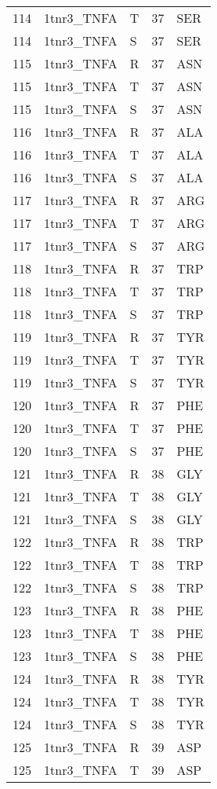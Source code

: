 \begin{tiny}
\begin{longtable}[l]{l|l|l|l|l}
	114 & 1tnr3\_TNFA & T & 37 & SER \\
	114 & 1tnr3\_TNFA & S & 37 & SER \\
	115 & 1tnr3\_TNFA & R & 37 & ASN \\
	115 & 1tnr3\_TNFA & T & 37 & ASN \\
	115 & 1tnr3\_TNFA & S & 37 & ASN \\
	116 & 1tnr3\_TNFA & R & 37 & ALA \\
	116 & 1tnr3\_TNFA & T & 37 & ALA \\
	116 & 1tnr3\_TNFA & S & 37 & ALA \\
	117 & 1tnr3\_TNFA & R & 37 & ARG \\
	117 & 1tnr3\_TNFA & T & 37 & ARG \\
	117 & 1tnr3\_TNFA & S & 37 & ARG \\
	118 & 1tnr3\_TNFA & R & 37 & TRP \\
	118 & 1tnr3\_TNFA & T & 37 & TRP \\
	118 & 1tnr3\_TNFA & S & 37 & TRP \\
	119 & 1tnr3\_TNFA & R & 37 & TYR \\
	119 & 1tnr3\_TNFA & T & 37 & TYR \\
	119 & 1tnr3\_TNFA & S & 37 & TYR \\
	120 & 1tnr3\_TNFA & R & 37 & PHE \\
	120 & 1tnr3\_TNFA & T & 37 & PHE \\
	120 & 1tnr3\_TNFA & S & 37 & PHE \\
	121 & 1tnr3\_TNFA & R & 38 & GLY \\
	121 & 1tnr3\_TNFA & T & 38 & GLY \\
	121 & 1tnr3\_TNFA & S & 38 & GLY \\
	122 & 1tnr3\_TNFA & R & 38 & TRP \\
	122 & 1tnr3\_TNFA & T & 38 & TRP \\
	122 & 1tnr3\_TNFA & S & 38 & TRP \\
	123 & 1tnr3\_TNFA & R & 38 & PHE \\
	123 & 1tnr3\_TNFA & T & 38 & PHE \\
	123 & 1tnr3\_TNFA & S & 38 & PHE \\
	124 & 1tnr3\_TNFA & R & 38 & TYR \\
	124 & 1tnr3\_TNFA & T & 38 & TYR \\
	124 & 1tnr3\_TNFA & S & 38 & TYR \\
	125 & 1tnr3\_TNFA & R & 39 & ASP \\
	125 & 1tnr3\_TNFA & T & 39 & ASP \\

\end{longtable}
\end{tiny}
